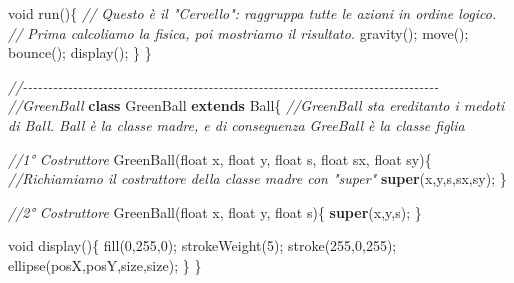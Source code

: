 \documentclass[
]{article}
\newenvironment{Shaded}{}{}
\newcommand{\CommentTok}[1]{\textcolor[rgb]{0.38,0.63,0.69}{\textit{#1}}}
\newcommand{\DataTypeTok}[1]{\textcolor[rgb]{0.56,0.13,0.00}{#1}}
\newcommand{\DecValTok}[1]{\textcolor[rgb]{0.25,0.63,0.44}{#1}}
\newcommand{\FunctionTok}[1]{\textcolor[rgb]{0.02,0.16,0.49}{#1}}
\newcommand{\KeywordTok}[1]{\textcolor[rgb]{0.00,0.44,0.13}{\textbf{#1}}}
\newcommand{\NormalTok}[1]{#1}
\newcommand{\OperatorTok}[1]{\textcolor[rgb]{0.40,0.40,0.40}{#1}}
\begin{document}
\begin{Shaded}
\begin{Highlighting}[]
  \DataTypeTok{void} \FunctionTok{run}\OperatorTok{()\{} 
    \CommentTok{// Questo è il "Cervello": raggruppa tutte le azioni in ordine logico.}
    \CommentTok{// Prima calcoliamo la fisica, poi mostriamo il risultato.}
    \FunctionTok{gravity}\OperatorTok{();}
    \FunctionTok{move}\OperatorTok{();}
    \FunctionTok{bounce}\OperatorTok{();}
    \FunctionTok{display}\OperatorTok{();}
  \OperatorTok{\}}
\OperatorTok{\}}

\CommentTok{//{-}{-}{-}{-}{-}{-}{-}{-}{-}{-}{-}{-}{-}{-}{-}{-}{-}{-}{-}{-}{-}{-}{-}{-}{-}{-}{-}{-}{-}{-}{-}{-}{-}{-}{-}{-}{-}{-}{-}{-}{-}{-}{-}{-}{-}{-}{-}{-}{-}{-}{-}{-}{-}{-}{-}{-}{-}{-}{-}{-}{-}{-}{-}{-}{-}{-}{-}{-}{-}{-}{-}{-}{-}{-}{-}{-}{-}{-}{-}{-}{-}{-}{-}}
\CommentTok{//GreenBall}
\KeywordTok{class}\NormalTok{ GreenBall }\KeywordTok{extends}\NormalTok{ Ball}\OperatorTok{\{} \CommentTok{//GreenBall sta ereditanto i medoti di Ball. Ball è la classe madre, e di conseguenza GreeBall è la classe figlia}

  \CommentTok{//1° Costruttore}
  \FunctionTok{GreenBall}\OperatorTok{(}\DataTypeTok{float}\NormalTok{ x}\OperatorTok{,} \DataTypeTok{float}\NormalTok{ y}\OperatorTok{,} \DataTypeTok{float}\NormalTok{ s}\OperatorTok{,} \DataTypeTok{float}\NormalTok{ sx}\OperatorTok{,} \DataTypeTok{float}\NormalTok{ sy}\OperatorTok{)\{}
  \CommentTok{//Richiamiamo il costruttore della classe madre con "super"}
  \KeywordTok{super}\OperatorTok{(}\NormalTok{x}\OperatorTok{,}\NormalTok{y}\OperatorTok{,}\NormalTok{s}\OperatorTok{,}\NormalTok{sx}\OperatorTok{,}\NormalTok{sy}\OperatorTok{);}
  \OperatorTok{\}}
  
  \CommentTok{//2° Costruttore}
  \FunctionTok{GreenBall}\OperatorTok{(}\DataTypeTok{float}\NormalTok{ x}\OperatorTok{,} \DataTypeTok{float}\NormalTok{ y}\OperatorTok{,} \DataTypeTok{float}\NormalTok{ s}\OperatorTok{)\{}
    \KeywordTok{super}\OperatorTok{(}\NormalTok{x}\OperatorTok{,}\NormalTok{y}\OperatorTok{,}\NormalTok{s}\OperatorTok{);}
  \OperatorTok{\}}
  
  \DataTypeTok{void} \FunctionTok{display}\OperatorTok{()\{}
    \FunctionTok{fill}\OperatorTok{(}\DecValTok{0}\OperatorTok{,}\DecValTok{255}\OperatorTok{,}\DecValTok{0}\OperatorTok{);}
    \FunctionTok{strokeWeight}\OperatorTok{(}\DecValTok{5}\OperatorTok{);}
    \FunctionTok{stroke}\OperatorTok{(}\DecValTok{255}\OperatorTok{,}\DecValTok{0}\OperatorTok{,}\DecValTok{255}\OperatorTok{);}
    \FunctionTok{ellipse}\OperatorTok{(}\NormalTok{posX}\OperatorTok{,}\NormalTok{posY}\OperatorTok{,}\NormalTok{size}\OperatorTok{,}\NormalTok{size}\OperatorTok{);}
  \OperatorTok{\}}
\OperatorTok{\}}
\end{Highlighting}
\end{Shaded}
\end{document}
